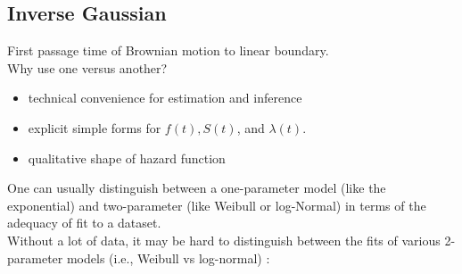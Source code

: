 \documentclass[11pt,slidesonly,semrot,portrait,palatino]{book}
\begin{document}
\subsection{Inverse Gaussian}
First passage time of Brownian motion to linear boundary.
\\[2ex]
Why use one versus another?
\begin{itemize}
\item technical convenience for estimation and inference\\[2ex]
\item explicit simple forms for $f(t), S(t)$, and $\lambda(t)$.\\[2ex]
\item qualitative shape of hazard function
\end{itemize}
One can usually distinguish between a one-parameter
model (like the exponential) and two-parameter (like Weibull or
log-Normal) in terms of the adequacy of fit to a dataset.
\\[2ex]
Without a lot of data, it may be hard to distinguish between
the fits of various 2-parameter models (i.e., Weibull vs log-normal)
\newpage
:
\end{document}
